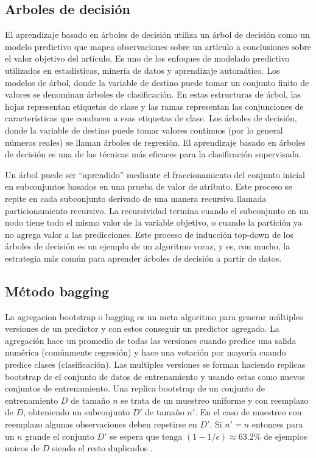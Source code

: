 \subsection{Arboles de decisión}

El aprendizaje basado en árboles de decisión utiliza un árbol de decisión como un modelo predictivo que mapea observaciones sobre un artículo a conclusiones sobre el valor objetivo del artículo. Es uno de los enfoques de modelado predictivo utilizados en estadísticas, minería de datos y aprendizaje automático. 
Los modelos de árbol, donde la variable de destino puede tomar un conjunto finito de valores se denominan árboles de clasificación. 
En estas estructuras de árbol, las hojas representan etiquetas de clase y las ramas representan las conjunciones de características que conducen a esas etiquetas de clase. 
Los árboles de decisión, donde la variable de destino puede tomar valores continuos (por lo general números reales) se llaman árboles de regresión. El aprendizaje basado en árboles de decisión es una de las técnicas más eficaces para la clasificación supervisada.

Un árbol puede ser ``aprendido'' mediante el fraccionamiento del conjunto inicial en subconjuntos basados en una prueba de valor de atributo. 
Este proceso se repite en cada subconjunto derivado de una manera recursiva llamada particionamiento recursivo. 
La recursividad termina cuando el subconjunto en un nodo tiene todo el mismo valor de la variable objetivo, o cuando la partición ya no agrega valor a las predicciones. 
Este proceso de inducción top-down de los árboles de decisión \cite{InductionofDecisionTrees1986}
es un ejemplo de un algoritmo voraz, y es, con mucho, la estrategia más común para aprender árboles de decisión a partir de datos.

\subsection{Método bagging}
La agregacion bootstrap o bagging es un meta algoritmo para generar múltiples versiones de un predictor y con estos conseguir un predictor agregado. La agregación hace un promedio de todas las versiones cuando predice una salida numérica (comúnmente regresión) y hace una votación por mayoría cuando predice clases (clasificación).
Las multiples versiones se forman haciendo replicas bootstrap de el conjunto de datos de entrenamiento y usando estas como nuevos conjuntos de entrenamiento.
Una replica bootstrap de un conjunto de entrenamiento $D$ de tamaño $n$ se trata de un muestreo uniforme y con reemplazo de $D$, obteniendo un subconjunto $D'$ de tamaño $n'$. En el caso de muestreo con reemplazo algunas observaciones deben repetirse en $D'$. Si $n'=n$ entonces para un $n$ grande el conjunto $D'$ se espera que tenga $(1-1/e) \approx 63.2\%$ de ejemplos unicos de $D$ siendo el resto duplicados \cite{EstimatingtheSizeandConfidenceofaStatisticalAudit}.

